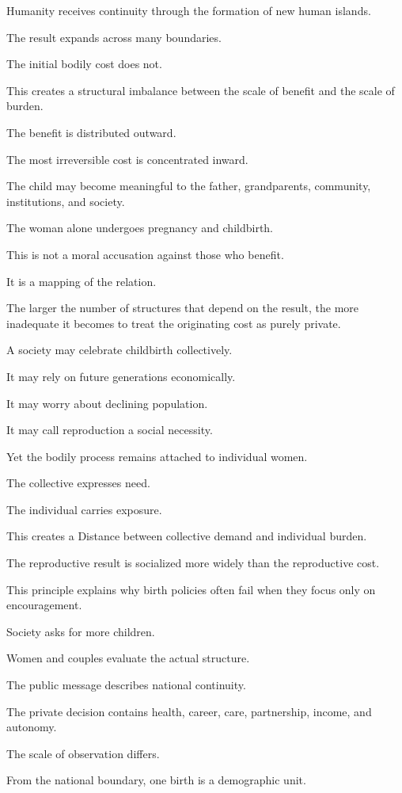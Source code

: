 Humanity receives continuity through the formation of new human islands.

The result expands across many boundaries.

The initial bodily cost does not.

This creates a structural imbalance between the scale of benefit and the scale of burden.

The benefit is distributed outward.

The most irreversible cost is concentrated inward.

The child may become meaningful to the father, grandparents, community, institutions, and society.

The woman alone undergoes pregnancy and childbirth.

This is not a moral accusation against those who benefit.

It is a mapping of the relation.

The larger the number of structures that depend on the result, the more inadequate it becomes to treat the originating cost as purely private.

A society may celebrate childbirth collectively.

It may rely on future generations economically.

It may worry about declining population.

It may call reproduction a social necessity.

Yet the bodily process remains attached to individual women.

The collective expresses need.

The individual carries exposure.

This creates a Distance between collective demand and individual burden.

The reproductive result is socialized more widely than the reproductive cost.

This principle explains why birth policies often fail when they focus only on encouragement.

Society asks for more children.

Women and couples evaluate the actual structure.

The public message describes national continuity.

The private decision contains health, career, care, partnership, income, and autonomy.

The scale of observation differs.

From the national boundary, one birth is a demographic unit.

